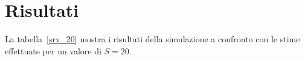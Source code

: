 \section{Risultati}
La tabella~\ref{srv_20} mostra i risultati della simulazione a confronto con le
stime effettuate per un valore di $S = 20$.


